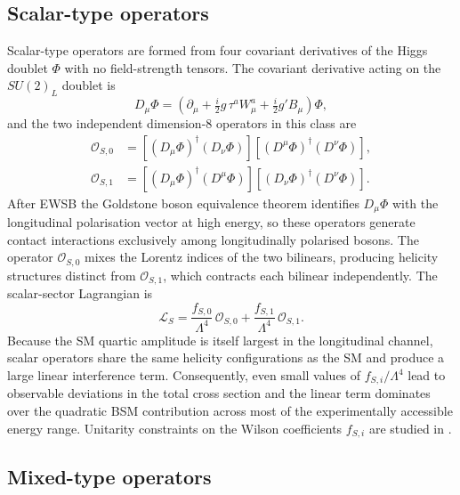 \subsection{Scalar-type operators}

Scalar-type operators are formed from four covariant derivatives of the Higgs doublet $\Phi$ with no field-strength tensors. The covariant derivative acting on the $SU(2)_L$ doublet is
\begin{equation}
D_{\mu}\Phi = \left(\partial_{\mu} + \tfrac{i}{2}g\,\tau^{a}W_{\mu}^{a} + \tfrac{i}{2}g'B_{\mu}\right)\Phi,
\end{equation}
and the two independent dimension-8 operators in this class are \cite{Eboli_2016}
\begin{align}
\mathcal{O}_{S,0} &= \left[(D_{\mu}\Phi)^{\dagger}(D_{\nu}\Phi)\right] \left[(D^{\mu}\Phi)^{\dagger}(D^{\nu}\Phi)\right], \\[4pt] \mathcal{O}_{S,1} &= \left[(D_{\mu}\Phi)^{\dagger}(D^{\mu}\Phi)\right] \left[(D_{\nu}\Phi)^{\dagger}(D^{\nu}\Phi)\right].
\end{align}
After EWSB the Goldstone boson equivalence theorem identifies $D_\mu\Phi$ with the longitudinal polarisation vector at high energy, so these operators generate contact interactions exclusively among longitudinally polarised bosons. The operator $\mathcal{O}_{S,0}$ mixes the Lorentz indices of the two bilinears, producing helicity structures distinct from $\mathcal{O}_{S,1}$, which contracts each bilinear independently. The scalar-sector Lagrangian is
\begin{equation}
\mathcal{L}_{S} = \frac{f_{S,0}}{\Lambda^{4}}\,\mathcal{O}_{S,0} + \frac{f_{S,1}}{\Lambda^{4}}\,\mathcal{O}_{S,1}.
\end{equation}
Because the SM quartic amplitude is itself largest in the longitudinal channel, scalar operators share the same helicity configurations as the SM and produce a large linear interference term. Consequently, even small values of $f_{S,i}/\Lambda^4$ lead to observable deviations in the total cross section and the linear term dominates over the quadratic BSM contribution across most of the experimentally accessible energy range. Unitarity constraints on the Wilson coefficients $f_{S,i}$ are studied in \cite{PhysRevD.101.113003}.

\subsection{Mixed-type operators}

